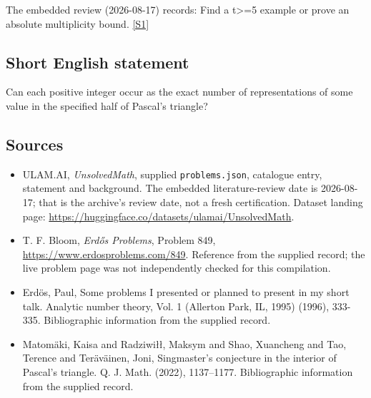 \documentclass[11pt,a4paper]{article}
\newcommand{\sref}[2]{\hyperlink{source:#1:#2}{[S#2]}}
\begin{document}
The embedded review (2026-08-17) records: Find a t>=5 example or prove an absolute multiplicity bound. \sref{statement}{1}

\subsection{Short English statement}

Can each positive integer occur as the exact number of representations of some value in the specified half of Pascal's triangle?

\subsection{Sources}

{\small

\begin{itemize}

\item[\hypertarget{source:statement:1}{S1}] ULAM.AI, \emph{UnsolvedMath}, supplied \texttt{problems.json}, catalogue entry, statement and background. The embedded literature-review date is 2026-08-17; that is the archive’s review date, not a fresh certification. Dataset landing page: \url{https://huggingface.co/datasets/ulamai/UnsolvedMath}.

\item[\hypertarget{source:statement:2}{S2}] T. F. Bloom, \emph{Erdős Problems}, Problem 849, \url{https://www.erdosproblems.com/849}. Reference from the supplied record; the live problem page was not independently checked for this compilation.

\item[\hypertarget{source:statement:3}{S3}] Erd\"{o}s, Paul, Some problems I presented or planned to present in my short talk. Analytic number theory, Vol. 1 (Allerton Park, IL, 1995) (1996), 333-335. Bibliographic information from the supplied record.

\item[\hypertarget{source:statement:4}{S4}] Matom\"{a}ki, Kaisa and Radziwi\l\l, Maksym and Shao, Xuancheng and Tao, Terence and Ter\"{a}v\"{a}inen, Joni, Singmaster's conjecture in the interior of {P}ascal's triangle. Q. J. Math. (2022), 1137--1177. Bibliographic information from the supplied record.

\end{itemize}

}

\label{end:statement}
\end{document}
